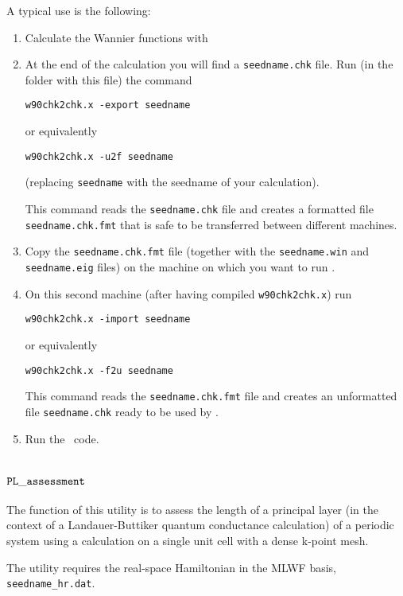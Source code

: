 A typical use is the following:
\begin{enumerate}
\item Calculate the Wannier functions with \wannier
\item At the end of the calculation you will find a \verb|seedname.chk|
  file. Run (in the folder with this file) the command
\begin{verbatim}
w90chk2chk.x -export seedname
\end{verbatim}
or equivalently
\begin{verbatim}
w90chk2chk.x -u2f seedname
\end{verbatim}
(replacing \verb|seedname| with the seedname of your calculation).

This command reads the \verb|seedname.chk| file and creates a
formatted file  \verb|seedname.chk.fmt| that is safe to be transferred
between different machines.
\item Copy the \verb|seedname.chk.fmt| file (together with the
  \verb|seedname.win| and \verb|seedname.eig| files) on the machine on
  which you want to run \postw.
\item On this second machine (after having compiled
  \verb|w90chk2chk.x|) run
\begin{verbatim}
w90chk2chk.x -import seedname
\end{verbatim}
or equivalently
\begin{verbatim}
w90chk2chk.x -f2u seedname
\end{verbatim}

This command reads the \verb|seedname.chk.fmt| file and creates an
unformatted file  \verb|seedname.chk| ready to be used by \postw.

\item Run the \postw\ code.

\end{enumerate}


\section{$\tt{PL\_assessment}$}
\label{sec:pl_assessment}

The function of this utility is to assess the length of a principal
layer (in the context of a Landauer-Buttiker quantum conductance
calculation) of a periodic system using a calculation on a single unit
cell with a dense k-point mesh.

The utility requires the real-space Hamiltonian in the MLWF basis,
\verb|seedname_hr.dat|.


